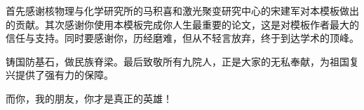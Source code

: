 
首先感谢核物理与化学研究所的马积喜和激光聚变研究中心的宋建军对本模板做出的贡献。其次感谢你使用本模板完成你人生最重要的论文，这是对模板作者最大的信任与支持。同时要感谢你，历经磨难，但从不轻言放弃，终于到达学术的顶峰。

铸国防基石，做民族脊梁。最后致敬所有九院人，正是大家的无私奉献，为祖国复兴提供了强有力的保障。

而你，我的朋友，你才是真正的英雄！